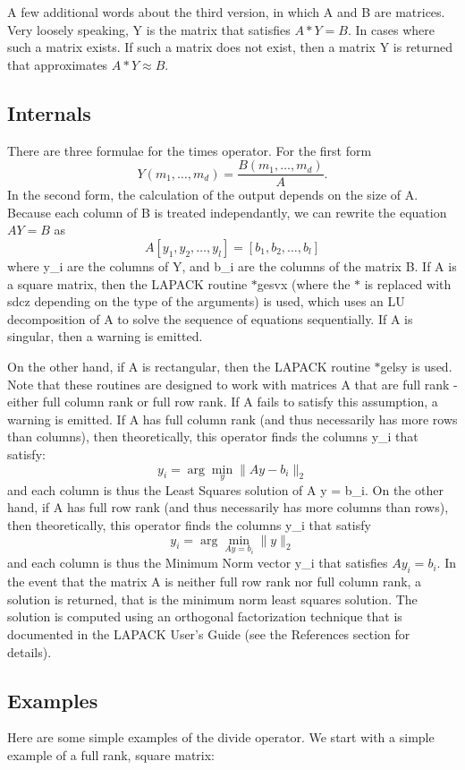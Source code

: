 {\ttfamily A few additional words about the third version, in which {\ttfamily A} and {\ttfamily B} are matrices. Very loosely speaking, {\ttfamily Y} is the matrix that satisfies $A * Y = B$. In cases where such a matrix exists. If such a matrix does not exist, then a matrix {\ttfamily Y} is returned that approximates $A * Y \approx B$. }\hypertarget{transforms_svd_Function}{}\subsection{Internals}\label{transforms_svd_Function}
{\ttfamily There are three formulae for the times operator. For the first form \[ Y(m_1,\ldots,m_d) = \frac{B(m_1,\ldots,m_d)}{A}. \] In the second form, the calculation of the output depends on the size of {\ttfamily A}. Because each column of {\ttfamily B} is treated independantly, we can rewrite the equation $A Y = B$ as \[ A [y_1, y_2,\ldots, y_l] = [b_1, b_2, \ldots, b_l] \] where {\ttfamily y\-\_\-i} are the columns of {\ttfamily Y}, and {\ttfamily b\-\_\-i} are the columns of the matrix {\ttfamily B}. If {\ttfamily A} is a square matrix, then the L\-A\-P\-A\-C\-K routine {\ttfamily $\ast$gesvx} (where the {\ttfamily $\ast$} is replaced with {\ttfamily sdcz} depending on the type of the arguments) is used, which uses an L\-U decomposition of {\ttfamily A} to solve the sequence of equations sequentially. If {\ttfamily A} is singular, then a warning is emitted.}

{\ttfamily On the other hand, if {\ttfamily A} is rectangular, then the L\-A\-P\-A\-C\-K routine {\ttfamily $\ast$gelsy} is used. Note that these routines are designed to work with matrices {\ttfamily A} that are full rank -\/ either full column rank or full row rank. If {\ttfamily A} fails to satisfy this assumption, a warning is emitted. If {\ttfamily A} has full column rank (and thus necessarily has more rows than columns), then theoretically, this operator finds the columns {\ttfamily y\-\_\-i} that satisfy\-: \[ y_i = \arg \min_y \| A y - b_i \|_2 \] and each column is thus the Least Squares solution of {\ttfamily A y = b\-\_\-i}. On the other hand, if {\ttfamily A} has full row rank (and thus necessarily has more columns than rows), then theoretically, this operator finds the columns {\ttfamily y\-\_\-i} that satisfy \[ y_i = \arg \min_{A y = b_i} \| y \|_2 \] and each column is thus the Minimum Norm vector {\ttfamily y\-\_\-i} that satisfies $A y_i = b_i$. In the event that the matrix {\ttfamily A} is neither full row rank nor full column rank, a solution is returned, that is the minimum norm least squares solution. The solution is computed using an orthogonal factorization technique that is documented in the L\-A\-P\-A\-C\-K User's Guide (see the References section for details). }\hypertarget{variables_matrix_Examples}{}\subsection{Examples}\label{variables_matrix_Examples}
{\ttfamily Here are some simple examples of the divide operator. We start with a simple example of a full rank, square matrix\-:}

